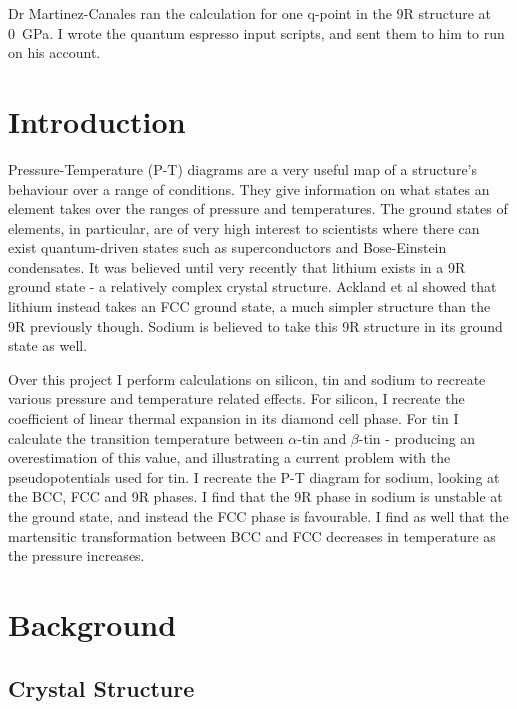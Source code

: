 \documentclass[12pt]{article}
\begin{document}
Dr Martinez-Canales ran the calculation for one q-point in the 9R structure at \SI{0}{\giga\pascal}. I wrote the quantum espresso input scripts, and sent them to him to run on his account.
\maintext


\section{Introduction}
Pressure-Temperature (P-T) diagrams are a very useful map of a structure's behaviour over a range of conditions. They give information on what states an element takes over the ranges of pressure and temperatures. The ground states of elements, in particular, are of very high interest to scientists where there can exist quantum-driven states such as superconductors and Bose-Einstein condensates. It was believed until very recently that lithium exists in a 9R ground state - a relatively complex crystal structure. 
Ackland et al \cite{ackland2017quantum} showed that lithium instead takes an FCC ground state, a much simpler structure than the 9R previously though. Sodium is believed to take this 9R structure in its ground state as well.

Over this project I perform calculations on silicon, tin and sodium to recreate various pressure and temperature related effects. For silicon, I recreate the coefficient of linear thermal expansion in its diamond cell phase. For tin I calculate the transition temperature between $\alpha$-tin and $\beta$-tin - producing an overestimation of this value, and illustrating a current problem with the pseudopotentials used for tin. 
I recreate the P-T diagram for sodium, looking at the BCC, FCC and 9R phases. I find that the 9R phase in sodium is unstable at the ground state, and instead the FCC phase is favourable. I find as well that the martensitic transformation between BCC and FCC decreases in temperature as the pressure increases.

\section{Background}
\subsection{Crystal Structure}
\end{document}
